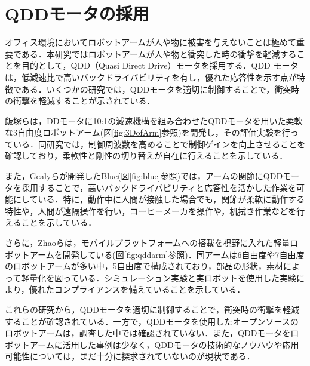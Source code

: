 
\section{QDDモータの採用}
オフィス環境においてロボットアームが人や物に被害を与えないことは極めて重要である．本研究ではロボットアームが人や物と衝突した時の衝撃を軽減することを目的として，QDD（Quasi Direct Drive）モータを採用する．QDD モータは，低減速比で高いバックドライバビリティを有し，優れた応答性を示す点が特徴である．いくつかの研究では，QDDモータを適切に制御することで，衝突時の衝撃を軽減することが示されている．

飯塚ら\cite{飯塚浩太2021}は，DDモータに10:1の減速機構を組み合わせたQDDモータを用いた柔軟な3自由度ロボットアーム(図\ref{fig:3DofArm}参照)を開発し，その評価実験を行っている．同研究では，制御周波数を高めることで制御ゲインを向上させることを確認しており，柔軟性と剛性の切り替えが自在に行えることを示している．

また，Gealyら\cite{gealy2019}が開発したBlue(図\ref{fig:blue}参照)では，アームの関節にQDDモータを採用することで，高いバックドライバビリティと応答性を活かした作業を可能にしている．特に，動作中に人間が接触した場合でも，関節が柔軟に動作する特性や，人間が遠隔操作を行い，コーヒーメーカを操作や，机拭き作業などを行えることを示している\cite{Blue:online}．

さらに，Zhaoら\cite{10106520}は，モバイルプラットフォームへの搭載を視野に入れた軽量ロボットアームを開発している(図\ref{fig:qddarm}参照)．同アームは6自由度や7自由度のロボットアームが多い中，5自由度で構成されており，部品の形状，素材によって軽量化を図っている．シミュレーション実験と実ロボットを使用した実験により，優れたコンプライアンスを備えていることを示している．

これらの研究から，QDDモータを適切に制御することで，衝突時の衝撃を軽減することが確認されている．一方で，QDDモータを使用したオープンソースのロボットアームは，調査した中では確認されていない．また，QDDモータをロボットアームに活用した事例は少なく，QDDモータの技術的なノウハウや応用可能性については，まだ十分に探求されていないのが現状である．

